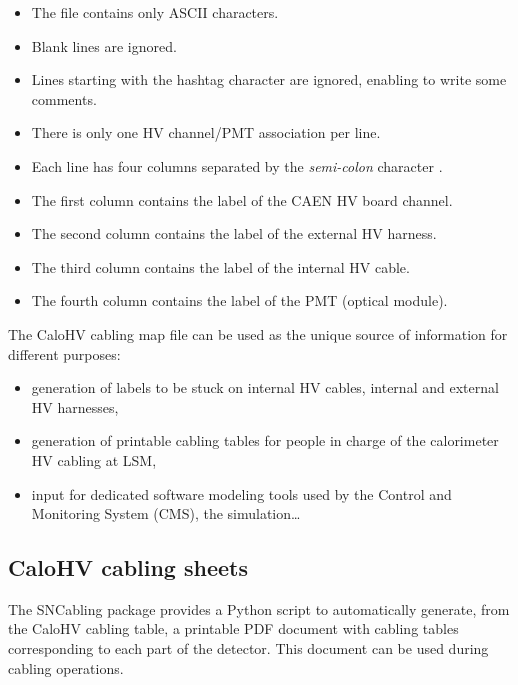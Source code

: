 \begin{itemize}
\item The file contains only ASCII characters.
\item Blank lines are ignored.
\item Lines starting with the hashtag character \fbox{\texttt{\#}} are
  ignored, enabling to write some comments.
\item There is only one HV channel/PMT association per line.
\item Each  line has  four columns  separated by  the \emph{semi-colon}
  character \fbox{\texttt{;}}.
\item The first column contains the label of the CAEN HV board channel.
\item The second column contains the label of the external HV harness.
\item The third column contains the label of the internal HV cable.
\item The fourth column contains the label of the PMT (optical module).
\end{itemize}

\par\noindent The  CaloHV cabling map file  can be used as  the unique
source of information for different purposes:
\begin{itemize}
\item generation of labels to be stuck on internal HV cables, internal
  and external HV harnesses,
\item generation of  printable cabling tables for people  in charge of
  the calorimeter HV cabling at LSM,
\item input for dedicated software  modeling tools used by the Control
  and Monitoring System (CMS), the simulation\dots
\end{itemize}


\subsection{CaloHV cabling sheets}


The  SNCabling  package  provides  a  Python  script  to  automatically
generate, from the CaloHV cabling table, a printable PDF document with
cabling  tables  corresponding to  each  part  of the  detector.  This
document can be used during cabling operations.





